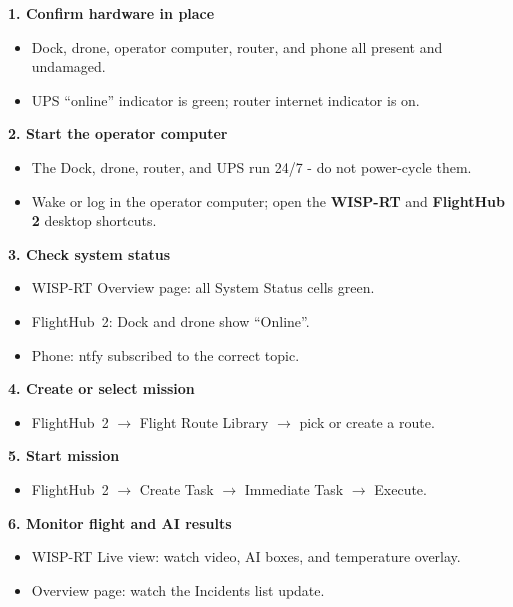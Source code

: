 \documentclass[11pt,letterpaper]{article}
\begin{document}
\begin{tcolorbox}[colback=uavlight, colframe=uavblue, boxrule=0.8pt, arc=3pt,
  title={\bfseries Daily WISP-RT Operating Workflow}, coltitle=white,
  colbacktitle=uavblue, fonttitle=\Large]

\textbf{1. Confirm hardware in place}
\begin{itemize}[leftmargin=1.5em, itemsep=0.1em]
  \item Dock, drone, operator computer, router, and phone all present and undamaged.
  \item UPS ``online'' indicator is green; router internet indicator is on.
\end{itemize}

\textbf{2. Start the operator computer}
\begin{itemize}[leftmargin=1.5em, itemsep=0.1em]
  \item The Dock, drone, router, and UPS run 24/7 - do not power-cycle them.
  \item Wake or log in the operator computer; open the \textbf{WISP-RT} and \textbf{FlightHub 2} desktop shortcuts.
\end{itemize}

\textbf{3. Check system status}
\begin{itemize}[leftmargin=1.5em, itemsep=0.1em]
  \item WISP-RT Overview page: all System Status cells green.
  \item FlightHub~2: Dock and drone show ``Online''.
  \item Phone: ntfy subscribed to the correct topic.
\end{itemize}

\textbf{4. Create or select mission}
\begin{itemize}[leftmargin=1.5em, itemsep=0.1em]
  \item FlightHub~2 $\rightarrow$ Flight Route Library $\rightarrow$ pick or create a route.
\end{itemize}

\textbf{5. Start mission}
\begin{itemize}[leftmargin=1.5em, itemsep=0.1em]
  \item FlightHub~2 $\rightarrow$ Create Task $\rightarrow$ Immediate Task $\rightarrow$ Execute.
\end{itemize}

\textbf{6. Monitor flight and AI results}
\begin{itemize}[leftmargin=1.5em, itemsep=0.1em]
  \item WISP-RT Live view: watch video, AI boxes, and temperature overlay.
  \item Overview page: watch the Incidents list update.
\end{itemize}


\end{tcolorbox}
\end{document}
